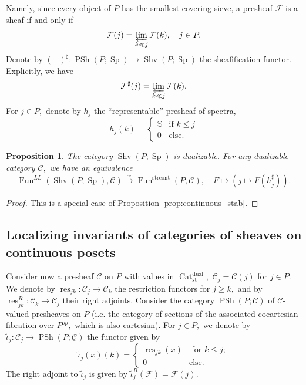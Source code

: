 \documentclass[11pt,leqno]{amsart}
\newtheorem{prop}[theo]{Proposition}
\numberwithin{equation}{section}
\def\bS{\mathbb{S}}
\newcommand{\prolim}[1][]{\mathop{\varprojlim}\limits_{#1}}
\newcommand{\xto}{\xrightarrow}
\newcommand{\Cat}{\operatorname{Cat}}
\newcommand{\strcont}{\operatorname{strcont}}
\newcommand{\st}{\operatorname{st}}
\newcommand{\dual}{\operatorname{dual}}
\newcommand{\cF}{{\mathcal F}}
\newcommand{\cC}{{\mathcal C}}
\newcommand{\un}{\underline}
\newcommand{\Fun}{\operatorname{Fun}}
\newcommand{\PSh}{\operatorname{PSh}}
\newcommand{\Sh}{\operatorname{Shv}}
\newcommand{\Sp}{\operatorname{Sp}}
\newcommand{\res}{\operatorname{res}}
\begin{document}
Namely, since every object of $P$ has the smallest covering sieve, a presheaf $\cF$ is a sheaf if and only if
$$\cF(j)=\prolim[k\ll j]\cF(k),\quad j\in P.$$
Denote by $(-)^{\sharp}:\PSh(P;\Sp)\to\Sh(P;\Sp)$ the sheafification functor. Explicitly, we have
\begin{equation}\label{eq:sheafification_on_cont_posets} \cF^{\sharp}(j)=\prolim[k\ll j]\cF(k).\end{equation} For $j\in P,$ denote by $h_j$ the ``representable'' presheaf of spectra, 
$$h_j(k)=\begin{cases}\bS & \text{if }k\leq j\\
0 & \text{else.}\end{cases}$$

\begin{prop}\label{prop:Stab_cont_of_cont_posets} The category $\Sh(P;\Sp)$ is dualizable. For any dualizable category $\cC,$ we have an equivalence
$$\Fun^{LL}(\Sh(P;\Sp),\cC)\xto{\sim} \Fun^{\strcont}(P,\cC),\quad F\mapsto(j\mapsto F(h_j^{\sharp})).$$
\end{prop}

\begin{proof}This is a special case of Proposition \ref{prop:continuous_stab}.
\end{proof}

\subsection{Localizing invariants of categories of sheaves on continuous posets}
\label{ssec:U_loc_sh_on_cont}

Consider now a presheaf $\un{\cC}$ on $P$ with values in $\Cat_{\st}^{\dual},$ $\cC_j=\un{\cC}(j)$ for $j\in P.$ We denote by $\res_{jk}:\cC_j\to\cC_k$ the restriction functors for $j\geq k,$ and by $\res_{jk}^R:\cC_k\to\cC_j$ their right adjoints. Consider the category $\PSh(P;\un{\cC})$ of $\un{\cC}$-valued presheaves on $P$ (i.e. the category of sections of the associated cocartesian fibration over $P^{op},$ which is also cartesian). For $j\in P,$ we denote by $\tilde{\iota}_j:\cC_j\to\PSh(P;\un{\cC})$ the functor given by
$$\tilde{\iota}_j(x)(k)=\begin{cases}\res_{jk}(x) & \text{ for }k\leq j;\\
0 & \text{else.}\end{cases}$$
The right adjoint to $\tilde{\iota}_j$ is given by $\tilde{\iota}_j^R(\cF)=\cF(j).$
\end{document}
